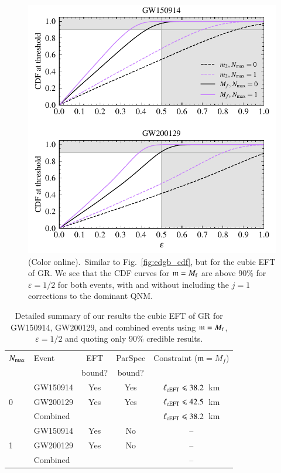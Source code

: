 \documentclass[twocolumn,
               prd,
               aps,
               superscriptaddress,
               tightenlines,
               nofootinbib,
               eqsecnum,
               amsfonts,
               amsmath,
               longbibliography]{revtex4-1}
\newcommand{\gm}{\mathfrak{m}}
\begin{document}
\begin{figure}[t]
\includegraphics[width=\columnwidth]{figs/ceft_cdf_varying_threshold.pdf}
\caption{(Color online).~Similar to Fig.~\ref{fig:edgb_cdf}, but for the cubic EFT of GR.
We see that the CDF curves for $\gm = M_{\rm f}$ are above 90\% for $\varepsilon =
1/2$ for both events, with and without including the $j = 1$ corrections to
the dominant QNM.
}
\label{fig:cEFT_cdf}
\end{figure}

\begin{table}[b]
\begin{tabular}{l l c c c}
\hline
\hline
$N_{\rm max}$ & Event & EFT    & ParSpec & Constraint ($\gm = M_{f}$) \\
              &       & bound? & bound?  &                            \\
\hline
  & GW150914  & Yes & Yes &  $\ell_{\rm cEFT} \leqslant 38.2$~km \\
0 & GW200129  & Yes & Yes &  $\ell_{\rm cEFT} \leqslant 42.5$~km \\
  & Combined  &     &     &  \cellcolor{black!10}$\ell_{\rm cEFT} \leqslant 38.2$~km \\
\hline
  & GW150914  & Yes  & No  &  -- \\
1 & GW200129  & Yes  & No  &  -- \\
  & Combined  &      &     &  -- \\
\hline
\hline
\end{tabular}
\caption{Detailed summary of our results the cubic EFT of GR for GW150914, GW200129, and
combined events using $\gm = M_{\rm f}$, $\varepsilon = 1/2$ and quoting only 90\% credible results.
}
\label{tab:summary_ceft}
\end{table}
\end{document}
